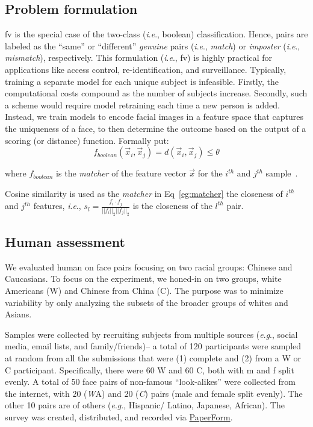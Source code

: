 \documentclass[10pt,twocolumn,letterpaper]{article}
\newcommand{\ie}{\textit{i}.\textit{e}., }
\newcommand{\eg}{\textit{e}.\textit{g}., }
\begin{document}
\subsection{Problem formulation}\label{subsec:pf} 
\Gls{fv} is the special case of the two-class (\ie boolean) classification. Hence, pairs are labeled as the ``same'' or ``different'' \textit{genuine} pairs (\ie \textit{match}) or \textit{imposter} (\ie \textit{mismatch}), respectively. This formulation (\ie \gls{fv}) is highly practical for applications like access control, re-identification, and surveillance. Typically, training a separate model for each unique subject is infeasible. Firstly, the computational costs compound as the number of subjects increase.  Secondly, such a scheme would require model retraining each time a new person is added. Instead, we train models to encode facial images in a feature space that captures the uniqueness of a face, to then determine the outcome based on the output of a scoring (or distance) function. Formally put:
\begin{equation}\label{eg:matcher}
    f_{boolean}(\vec{x}_i, \vec{x}_j) = d(\vec{x}_i, \vec{x}_j) \leq \theta
\end{equation}

where $f_{boolean}$ is the \textit{matcher} of the feature vector $\vec{x}$ for the $i^{th}$ and $j^{th}$ sample~\cite{LFWTech}.

Cosine similarity is used as the \emph{matcher} in Eq~\ref{eg:matcher} the closeness of $i^{th}$ and $j^{th}$ features, \ie
$
s_l= \frac{f_i\cdot f_j}{||f_i||_2||f_j||_2}
$ is the closeness of the $l^{th}$ pair. 


\subsection{Human assessment}\label{subsec:human-assessment}
We evaluated human on face pairs focusing on two racial groups: Chinese and Caucasians. To focus on the experiment, we honed-in on two groups, white Americans (W) and Chinese from China (C). The purpose was to minimize variability by only analyzing the subsets of the broader groups of whites and Asians. 

Samples were collected by recruiting subjects from multiple sources (\eg social media, email lists, and family/friends)-- a total of 120 participants were sampled at random from all the submissions that were (1) complete and (2) from a W or C participant. Specifically, there were 60 W and 60 C, both with \gls{m} and \gls{f} split evenly. A total of 50 face pairs of non-famous ``look-alikes'' were collected from the internet, with 20 ({\emph WA}) and 20 ({\emph C}) pairs (male and female split evenly). The other 10 pairs are of others (\eg Hispanic/ Latino, Japanese, African). The survey was created, distributed, and recorded via \href{https://paperform.co}{PaperForm}. 
\end{document}
